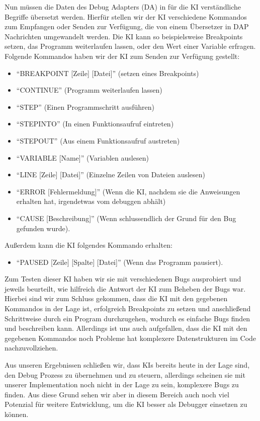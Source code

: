 \documentclass[a4paper,12pt,ngerman]{scrartcl}
\begin{document}
Nun müssen die Daten des Debug Adapters (DA) in für die KI verständliche Begriffe übersetzt werden. Hierfür stellen wir der KI verschiedene Kommandos zum Empfangen oder Senden zur Verfügung, die von einem Übersetzer in DAP Nachrichten umgewandelt werden. Die KI kann so beispielsweise Breakpoints setzen, das Programm weiterlaufen lassen, oder den Wert einer Variable erfragen. Folgende Kommandos haben wir der KI zum Senden zur Verfügung gestellt:
\begin{itemize}
	\item ``BREAKPOINT [Zeile] [Datei]'' (setzen eines Breakpoints)
	\item ``CONTINUE'' (Programm weiterlaufen lassen)
	\item ``STEP'' (Einen Programmschritt ausführen)
	\item ``STEPINTO'' (In einen Funktionsaufruf eintreten)
	\item ``STEPOUT'' (Aus einem Funktionsaufruf austreten)
	\item ``VARIABLE [Name]'' (Variablen auslesen)
	\item ``LINE [Zeile] [Datei]'' (Einzelne Zeilen von Dateien auslesen)
	\item ``ERROR [Fehlermeldung]'' (Wenn die KI, nachdem sie die Anweisungen erhalten hat, irgendetwas vom debuggen abhält)
	\item ``CAUSE [Beschreibung]'' (Wenn schlussendlich der Grund für den Bug gefunden wurde).
\end{itemize}
Außerdem kann die KI folgendes Kommando erhalten:
\begin{itemize}
	\item ``PAUSED [Zeile] [Spalte] [Datei]'' (Wenn das Programm pausiert).
\end{itemize}

Zum Testen dieser KI haben wir sie mit verschiedenen Bugs ausprobiert und jeweils beurteilt, wie hilfreich die Antwort der KI zum Beheben der Bugs war. Hierbei sind wir zum Schluss gekommen, dass die KI mit den gegebenen Kommandos in der Lage ist, erfolgreich Breakpoints zu setzen und anschließend Schrittweise durch ein Program durchzugehen, wodurch es einfache Bugs finden und beschreiben kann. Allerdings ist uns auch aufgefallen, dass die KI mit den gegebenen Kommandos noch Probleme hat komplexere Datenstrukturen im Code nachzuvollziehen.

Aus unseren Ergebnissen schließen wir, dass KIs bereits heute in der Lage sind, den Debug Prozess zu übernehmen und zu steuern, allerdings scheinen sie mit unserer Implementation noch nicht in der Lage zu sein, komplexere Bugs zu finden. Aus diese Grund sehen wir aber in diesem Bereich auch noch viel Potenzial für weitere Entwicklung, um die KI besser als Debugger einsetzen zu können.
\end{document}

